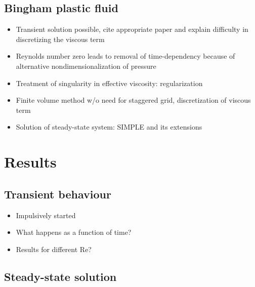 \documentclass[final,3p,twocolumn]{elsarticle}
\begin{document}
\subsection{Bingham plastic fluid}
\label{subsec:bingham}

\begin{itemize}
    \item Transient solution possible, cite appropriate paper and explain
        difficulty in discretizing the viscous term
    \item Reynolds number zero leads to removal of time-dependency because of
        alternative nondimensionalization of pressure 
    \item Treatment of singularity in effective viscosity: regularization
    \item Finite volume method w/o need for staggered grid, discretization of
        viscous term
    \item Solution of steady-state system: SIMPLE and its extensions
\end{itemize}

\section{Results}
\label{sec:results}

\subsection{Transient behaviour}
\label{subsec:transient}

\begin{itemize}
    \item Impulsively started
    \item What happens as a function of time? 
    \item Results for different Re? 
\end{itemize}

\subsection{Steady-state solution}
\label{subsec:steady}
\end{document}
